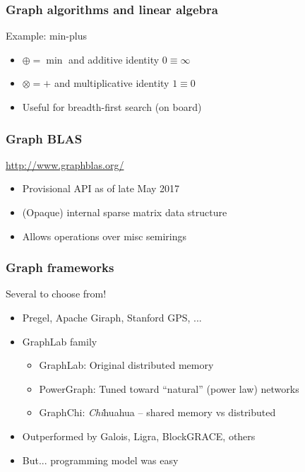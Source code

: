 \documentclass{beamer}
\begin{document}
\begin{frame}
  \frametitle{Graph algorithms and linear algebra}

  Example: min-plus
  \begin{itemize}
  \item $\oplus = \min$ and additive identity $0 \equiv \infty$
  \item $\otimes = +$ and multiplicative identity $1 \equiv 0$
  \item Useful for breadth-first search (on board)
  \end{itemize}
  
\end{frame}

\begin{frame}
  \frametitle{Graph BLAS}

  \begin{center}
    \url{http://www.graphblas.org/}
  \end{center}
  \begin{itemize}
  \item Provisional API as of late May 2017
  \item (Opaque) internal sparse matrix data structure
  \item Allows operations over misc semirings
  \end{itemize}
\end{frame}

\begin{frame}
  \frametitle{Graph frameworks}

  Several to choose from!
  \begin{itemize}
  \item Pregel, Apache Giraph, Stanford GPS, ...
  \item GraphLab family
    \begin{itemize}
    \item GraphLab: Original distributed memory
    \item PowerGraph: Tuned toward ``natural'' (power law) networks
    \item GraphChi: {\em Chi}huahua -- shared memory vs distributed
    \end{itemize}
  \item Outperformed by Galois, Ligra, BlockGRACE, others
  \item But... programming model was easy
  \end{itemize}
\end{frame}
\end{document}
